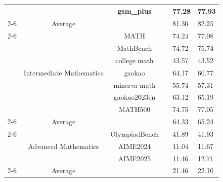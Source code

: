 \begin{table}[h]
\begin{tabular}{ccccll}
                                     &                                                                                                 & gsm\_plus           &  & 77.28 & 77.93 \\ \cmidrule{2-6} 
                                     & {Average}                                                                                &                     &  & 81.36 & 82.25 \\ \cmidrule{2-6} 
                                     & \multirow{7}{*}{{Intermediate Mathematics}}                                              & MATH                &  & 74.24 & 77.08 \\
                                     &                                                                                                 & MathBench           &  & 74.72 & 75.74 \\
                                     &                                                                                                 & college math        &  & 43.57 & 43.52 \\
                                     &                                                                                                 & gaokao              &  & 64.17 & 60.77 \\
                                     &                                                                                                 & minerva math        &  & 55.74 & 57.31 \\
                                     &                                                                                                 & gaokao2023en        &  & 63.12 & 65.19 \\
                                     &                                                                                                 & MATH500             &  & 74.75 & 77.05 \\ \cmidrule{2-6} 
                                     & {Average}                                                                                &                     &  & 64.33 & 65.24 \\ \cmidrule{2-6} 
                                     & \multirow{3}{*}{{Advanced Mathematics}}                                                  & OlympiadBench       &  & 41.89 & 41.93 \\
                                     &                                                                                                 & AIME2024            &  & 11.04 & 11.67 \\
                                     &                                                                                                 & AIME2025            &  & 11.46 & 12.71 \\ \cmidrule{2-6} 
                                     & {Average}                                                                                &                     &  & 21.46 & 22.10  \\ 
\bottomrule
\end{tabular}
\end{table}


